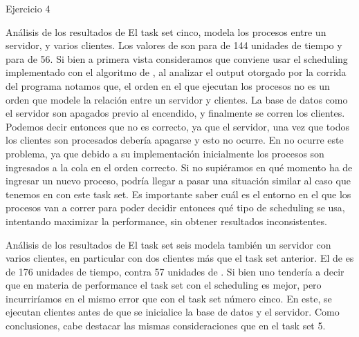 \begin{section}{Ejercicio 4}
\begin{subsection}{Análisis de los resultados de }
	El task set cinco, modela los procesos entre un servidor, y varios clientes. Los valores de  son para  de 144 unidades de tiempo y para  de 56. Si bien a primera vista consideramos que conviene usar el scheduling implementado con el algoritmo de , al analizar el output otorgado por la corrida del programa notamos que, el orden en el que ejecutan los procesos no es un orden que modele la relación entre un servidor y clientes. La base de datos como el servidor son apagados previo al encendido, y finalmente se corren los clientes. Podemos decir entonces que no es correcto, ya que el servidor, una vez que todos los clientes son procesados debería apagarse y esto no ocurre. 
	En  no ocurre este problema, ya que debido a su implementación inicialmente los procesos son ingresados a la cola en el orden correcto. Si no supiéramos en qué momento ha de ingresar un nuevo proceso, podría llegar a pasar una situación similar al caso que tenemos en  con este task set.
	Es importante saber cuál es el entorno en el que los procesos van a correr para poder decidir entonces qué tipo de scheduling se usa, intentando maximizar la performance, sin obtener resultados inconsistentes.
\end{subsection}

\begin{subsection}{Análisis de los resultados de }
	El task set seis modela también un servidor con varios clientes, en particular con dos clientes más que el task set anterior. El  de  es de 176 unidades de tiempo, contra 57 unidades de . Si bien uno tendería a decir que en materia de performance el task set con el scheduling  es mejor, pero incurriríamos en el mismo error que con el task set número cinco. En este, se ejecutan clientes antes de que se inicialice la base de datos y el servidor.
	Como conclusiones, cabe destacar las mismas consideraciones que en el task set 5.
\end{subsection}

\end{section}

